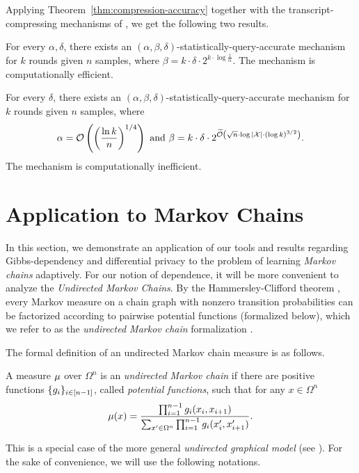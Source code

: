 \documentclass[12pt,a4paper,oneside,onecolumn]{book}
\begin{document}
 
Applying Theorem~\ref{thm:compression-accuracy} together with the transcript-compressing mechanisms of \citet{dwork2015generalization}, we get the following two results.

\begin{theorem}
\label{thm:main-compression-efficient}
    For every $\alpha,\delta$, there exists an $(\alpha,\beta,\delta)$-statistically-query-accurate mechanism for $k$ rounds given $n$ samples, where
    $\beta = k \cdot \delta \cdot 2^{k\cdot\log\frac{1}{\alpha}}$. The mechanism is computationally efficient.
  \end{theorem}


\begin{theorem}
\label{thm:main-compression-inefficient}
    For every $\delta$, there exists an $(\alpha,\beta,\delta)$-statistically-query-accurate mechanism for $k$ rounds given $n$ samples, where
    $$
    \alpha = \mathcal{O}\left(\left(\frac{\ln k}{n}\right)^{1/4}\right)
    \text{ and }
    \beta = k \cdot \delta \cdot 2^{\widetilde{\mathcal{O}}\left(\sqrt{n}\cdot\log|\mathcal{X}|\cdot(\log k)^{3/2}\right)}.
    $$ 
    The mechanism is computationally inefficient.
  \end{theorem}

\section{Application to Markov Chains}
\label{sec:umc}
In this section, we demonstrate an application of our tools and results regarding Gibbs-dependency and differential privacy to the problem of learning \emph{Markov chains} adaptively.
For our notion of dependence, it will be more convenient to analyze the 
\emph{Undirected Markov Chains}.
By the Hammersley-Clifford theorem
\citep{HammersleyClifford:1971,Clifford90}, every Markov measure on a chain graph with nonzero transition probabilities can be factorized according to pairwise potential functions (formalized below),
which we refer to as the {\em undirected Markov chain} formalization \citep{kontorovich12}.

The formal definition of an undirected Markov chain measure is as follows.

\begin{definition}
A measure $\mu$ over $\Omega^n$ is an {\em undirected Markov chain} if there are positive
functions $\{g_i\}_{i\in [n-1]}$, called {\em potential functions}, such that for any $x\in\Omega^n$
\[
\mu(x) = \frac{\prod_{i=1}^{n-1}g_i(x_i,x_{i+1})}
{\sum_{x'\in\Omega^n}\prod_{i=1}^{n-1}g_i(x'_i,x'_{i+1})}.
\]
\end{definition}
This is a special case of the more general \emph{undirected graphical model} (see \citet{lauritzen1996graphical}).
For the sake of convenience, we will use the following notations.
\end{document}
